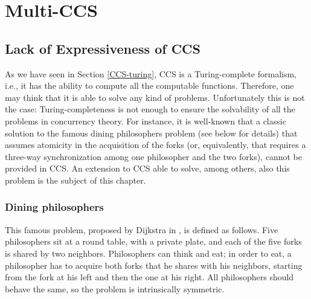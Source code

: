\chapter{Multi-CCS}\label{multi-ccs}





\section{Lack of Expressiveness of CCS}

As we have seen in Section \ref{CCS-turing}, CCS is a Turing-complete formalism, i.e., it has the 
ability to compute all the computable functions. 
Therefore, one may think that it is able to solve any kind of problems. 
Unfortunately this is not the case: Turing-completeness is not enough to ensure the solvability 
of all the problems in concurrency theory. For instance, it is well-known that a classic
solution to the famous dining philosophers
problem \cite{Dij71} (see below for details)  that assumes atomicity in the acquisition of the forks (or, equivalently,
that requires a three-way synchronization among one philosopher and the two forks), 
cannot be provided  in CCS. An extension to CCS able to solve, among others, also this problem 
is the subject of this chapter.


\subsection{Dining philosophers}
This famous problem, proposed by Dijkstra in \cite{Dij71}, is defined as follows.
Five philosophers sit at a round table, with a private plate, and each of the five forks is shared by two neighbors.
Philosophers can think and eat; in order to eat, a philosopher has to acquire both forks that he shares with his neighbors,
starting from the fork at his left and then the one at his right. 
All philosophers should behave the same, so the problem is intrinsically symmetric.


